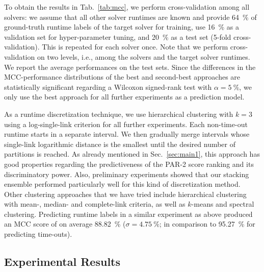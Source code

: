 \documentclass[runningheads]{llncs}
\begin{document}

To obtain the results in Tab.~\ref{tab:mcc}, we perform cross-validation among all solvers: we assume that all other solver runtimes are known and provide \SI{64}{\%} of ground-truth runtime labels of the target solver for training, use \SI{16}{\%} as a validation set for hyper-parameter tuning, and \SI{20}{\%} as a test set (5-fold cross-validation).
This is repeated for each solver once.
Note that we perform cross-validation on two levels, i.e., among the solvers and the target solver runtimes.
We report the average performances on the test sets.
Since the differences in the MCC-performance distributions of the best and second-best approaches are statistically significant regarding a Wilcoxon signed-rank test with $\alpha = \SI{5}{\%}$, we only use the best approach for all further experiments as a prediction model.

As a runtime discretization technique, we use hierarchical clustering with $k = 3$ using a log-single-link criterion for all further experiments.
Each non-time-out runtime starts in a separate interval.
We then gradually merge intervals whose single-link logarithmic distance is the smallest until the desired number of partitions is reached.
As already mentioned in Sec.~\ref{sec:main1}, this approach has good properties regarding the predictiveness of the PAR-2 score ranking and its discriminatory power.
Also, preliminary experiments showed that our stacking ensemble performed particularly well for this kind of discretization method.
Other clustering approaches that we have tried include hierarchical clustering with mean-, median- and complete-link criteria, as well as $k$-means and spectral clustering.
Predicting runtime labels in a similar experiment as above produced an MCC score of on average \SI{88.82}{\%} ($\sigma = \SI{4.75}{\%}$; in comparison to \SI{95.27}{\%} for predicting time-outs).

\subsection{Experimental Results}
\end{document}
